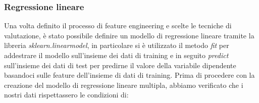 \subsubsection{Regressione lineare}
\fancyhead{}    %
Una volta definito il processo di feature engineering e scelte le tecniche di valutazione, è
stato possibile definire un modello di regressione lineare tramite la libreria \textit{sklearn.linearmodel},
in particolare si è utilizzato il metodo \textit{fit} per addestrare il modello sull’insieme dei dati di
training e in seguito \textit{predict} sull’insieme dei dati di test per predirne il valore della variabile
dipendente basandoci sulle feature dell’insieme di dati di training.
Prima di procedere con la creazione del modello di regressione lineare multipla, abbiamo
verificato che i nostri dati rispettassero le condizioni di:
